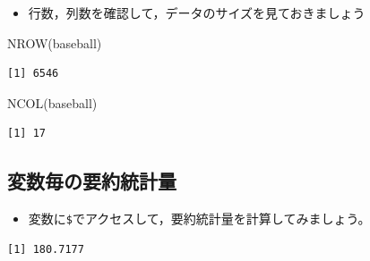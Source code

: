 \documentclass[
  a4paper,
]{ltjsbook}
\newenvironment{Shaded}{\begin{snugshade}}{\end{snugshade}}
\newcommand{\FunctionTok}[1]{\textcolor[rgb]{0.28,0.35,0.67}{#1}}
\newcommand{\NormalTok}[1]{\textcolor[rgb]{0.00,0.23,0.31}{#1}}
\newcommand{\SpecialCharTok}[1]{\textcolor[rgb]{0.37,0.37,0.37}{#1}}
\providecommand{\tightlist}{%
  \setlength{\itemsep}{0pt}\setlength{\parskip}{0pt}}\usepackage{longtable,booktabs,array}
\begin{document}
\begin{itemize}
\tightlist
\item
  行数，列数を確認して，データのサイズを見ておきましょう
\end{itemize}

\begin{Shaded}
\begin{Highlighting}[]
\FunctionTok{NROW}\NormalTok{(baseball)}
\end{Highlighting}
\end{Shaded}

\begin{verbatim}
[1] 6546
\end{verbatim}

\begin{Shaded}
\begin{Highlighting}[]
\FunctionTok{NCOL}\NormalTok{(baseball)}
\end{Highlighting}
\end{Shaded}

\begin{verbatim}
[1] 17
\end{verbatim}

\subsection{変数毎の要約統計量}\label{ux5909ux6570ux6bceux306eux8981ux7d04ux7d71ux8a08ux91cf}

\begin{itemize}
\tightlist
\item
  変数に\texttt{\$}でアクセスして，要約統計量を計算してみましょう。
\end{itemize}

\begin{Shaded}
\end{Shaded}

\begin{verbatim}
[1] 180.7177
\end{verbatim}

\begin{Shaded}
\end{Shaded}
\end{document}
